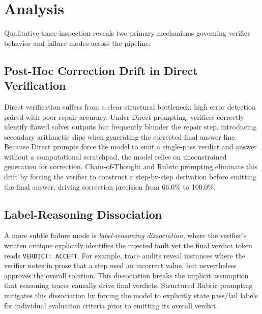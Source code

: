 \documentclass{article}
\begin{document}
\section{Analysis}

Qualitative trace inspection reveals two primary mechanisms governing verifier behavior and failure modes across the pipeline.

\subsection*{Post-Hoc Correction Drift in Direct Verification}
Direct verification suffers from a clear structural bottleneck: high error detection paired with poor repair accuracy. Under Direct prompting, verifiers correctly identify flawed solver outputs but frequently blunder the repair step, introducing secondary arithmetic slips when generating the corrected final answer line. Because Direct prompts force the model to emit a single-pass verdict and answer without a computational scratchpad, the model relies on unconstrained generation for correction. Chain-of-Thought and Rubric prompting eliminate this drift by forcing the verifier to construct a step-by-step derivation before emitting the final answer, driving correction precision from 66.0\% to 100.0\%.

\subsection*{Label-Reasoning Dissociation}
A more subtle failure mode is \emph{label-reasoning dissociation}, where the verifier's written critique explicitly identifies the injected fault yet the final verdict token reads \texttt{VERDICT: ACCEPT}. For example, trace audits reveal instances where the verifier notes in prose that a step used an incorrect value, but nevertheless approves the overall solution. This dissociation breaks the implicit assumption that reasoning traces causally drive final verdicts. Structured Rubric prompting mitigates this dissociation by forcing the model to explicitly state pass/fail labels for individual evaluation criteria prior to emitting its overall verdict.
\end{document}
